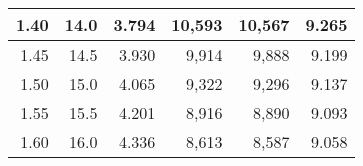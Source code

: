 \begin{longtable}{|r|r|r|r|r|r|}
			1.40                                                                                                   & 14.0                                                                                                  & 3.794                                                                                          & 10,593                                             & 10,567                                                    & 9.265                                             \\ \hline
			1.45                                                                                                   & 14.5                                                                                                  & 3.930                                                                                          & 9,914                                              & 9,888                                                     & 9.199                                             \\ \hline
			1.50                                                                                                   & 15.0                                                                                                  & 4.065                                                                                          & 9,322                                              & 9,296                                                     & 9.137                                             \\ \hline
			1.55                                                                                                   & 15.5                                                                                                  & 4.201                                                                                          & 8,916                                              & 8,890                                                     & 9.093                                             \\ \hline
			1.60                                                                                                   & 16.0                                                                                                  & 4.336                                                                                          & 8,613                                              & 8,587                                                     & 9.058                                             \\ \hline

\end{longtable}
